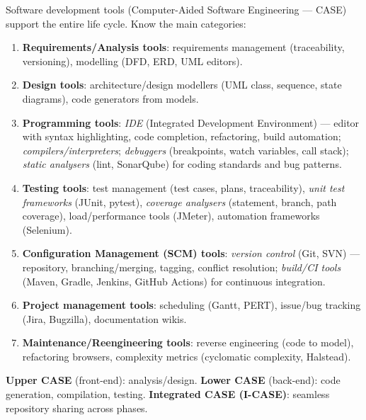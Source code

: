 \documentclass[11pt]{article}
\begin{document}
\begin{methode}
Software development tools (Computer-Aided Software Engineering — CASE) support the entire life cycle. Know the main categories:
\begin{enumerate}
\item \textbf{Requirements/Analysis tools}: requirements management (traceability, versioning), modelling (DFD, ERD, UML editors).
\item \textbf{Design tools}: architecture/design modellers (UML class, sequence, state diagrams), code generators from models.
\item \textbf{Programming tools}: \emph{IDE} (Integrated Development Environment) — editor with syntax highlighting, code completion, refactoring, build automation; \emph{compilers/interpreters}; \emph{debuggers} (breakpoints, watch variables, call stack); \emph{static analysers} (lint, SonarQube) for coding standards and bug patterns.
\item \textbf{Testing tools}: test management (test cases, plans, traceability), \emph{unit test frameworks} (JUnit, pytest), \emph{coverage analysers} (statement, branch, path coverage), load/performance tools (JMeter), automation frameworks (Selenium).
\item \textbf{Configuration Management (SCM) tools}: \emph{version control} (Git, SVN) — repository, branching/merging, tagging, conflict resolution; \emph{build/CI tools} (Maven, Gradle, Jenkins, GitHub Actions) for continuous integration.
\item \textbf{Project management tools}: scheduling (Gantt, PERT), issue/bug tracking (Jira, Bugzilla), documentation wikis.
\item \textbf{Maintenance/Reengineering tools}: reverse engineering (code to model), refactoring browsers, complexity metrics (cyclomatic complexity, Halstead).
\end{enumerate}
\textbf{Upper CASE} (front-end): analysis/design. \textbf{Lower CASE} (back-end): code generation, compilation, testing. \textbf{Integrated CASE (I-CASE)}: seamless repository sharing across phases.
\end{methode}
\end{document}
